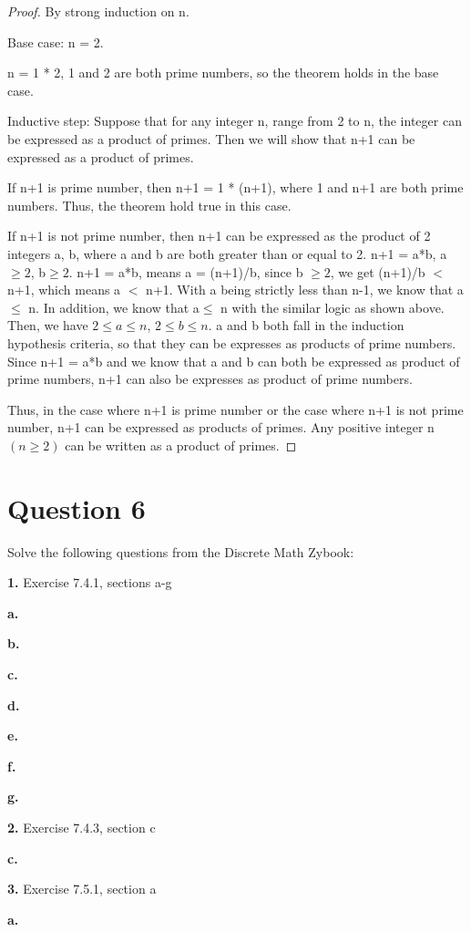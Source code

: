 \documentclass[11pt]{article}
\begin{document}
	\begin{proof}
	By strong induction on n.
	
	Base case: n = 2.
	
	n = 1 * 2, 1 and 2 are both prime numbers, so the theorem holds in the base case.
	
	Inductive step: Suppose that for any integer n, range from 2 to n, the integer can be expressed as a product of primes. Then we will show that n+1 can be expressed as a product of primes. 
	
	If n+1 is prime number, then n+1 = 1 * (n+1), where 1 and n+1 are both prime numbers. Thus, the theorem hold true in this case.
	
	If n+1 is not prime number, then n+1 can be expressed as the product of 2 integers a, b, where a and b are both greater than or equal to 2. n+1 = a*b, a$\geq 2$, b$\geq 2$. n+1 = a*b, means a = (n+1)/b, since b $\geq 2$, we get (n+1)/b $<$ n+1, which means a $<$ n+1. With a being strictly less than n-1, we know that a$\leq$ n. In addition, we know that a$\leq$ n with the similar logic as shown above. Then, we have $2\leq a\leq n$, $2\leq b\leq n$. a and b both fall in the induction hypothesis criteria, so that they can be expresses as products of prime numbers. Since n+1 = a*b and we know that a and b can both be expressed as product of prime numbers, n+1 can also be expresses as product of prime numbers. 
	
	Thus, in the case where n+1 is prime number or the case where n+1 is not prime number, n+1 can be expressed as products of primes. Any positive integer n $(n\geq 2)$ can be written as a product of primes.
	
	\end{proof}
	
	\newpage
	\section*{Question 6}
	
	Solve the following questions from the Discrete Math Zybook:
	
	\textbf{1. }Exercise 7.4.1, sections a-g
	
	\textbf{a.}
	
	\textbf{b.}
	
	\textbf{c.}
	
	\textbf{d.}
	
	\textbf{e.}
	
	\textbf{f.}
	
	\textbf{g.}
	
	\vspace{20mm}
	\textbf{2. }Exercise 7.4.3, section c
	
	\textbf{c.}
	
	\vspace{20mm}
	\textbf{3.} Exercise 7.5.1, section a
	
	\textbf{a.}

	
	
\end{document}
